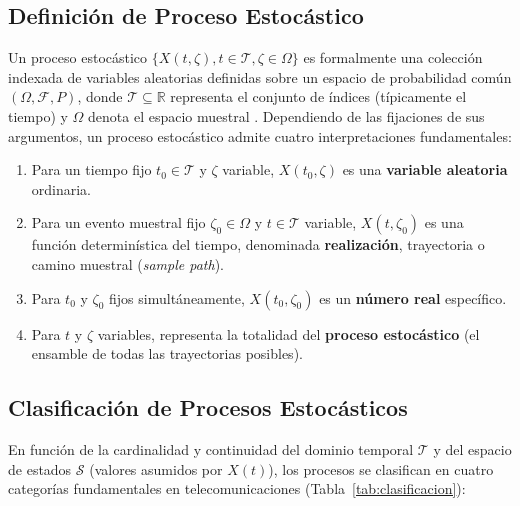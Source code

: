 \documentclass[conference]{IEEEtran}
\begin{document}
\subsection{Definición de Proceso Estocástico}
Un proceso estocástico $\{X(t, \zeta), t \in \mathcal{T}, \zeta \in \Omega\}$ es formalmente una colección indexada de variables aleatorias definidas sobre un espacio de probabilidad común $(\Omega, \mathcal{F}, P)$, donde $\mathcal{T} \subseteq \mathbb{R}$ representa el conjunto de índices (típicamente el tiempo) y $\Omega$ denota el espacio muestral \cite{papoulis2002}. Dependiendo de las fijaciones de sus argumentos, un proceso estocástico admite cuatro interpretaciones fundamentales:
\begin{enumerate}
    \item Para un tiempo fijo $t_0 \in \mathcal{T}$ y $\zeta$ variable, $X(t_0, \zeta)$ es una \textbf{variable aleatoria} ordinaria.
    \item Para un evento muestral fijo $\zeta_0 \in \Omega$ y $t \in \mathcal{T}$ variable, $X(t, \zeta_0)$ es una función determinística del tiempo, denominada \textbf{realización}, trayectoria o camino muestral (\textit{sample path}).
    \item Para $t_0$ y $\zeta_0$ fijos simultáneamente, $X(t_0, \zeta_0)$ es un \textbf{número real} específico.
    \item Para $t$ y $\zeta$ variables, representa la totalidad del \textbf{proceso estocástico} (el ensamble de todas las trayectorias posibles).
\end{enumerate}

\subsection{Clasificación de Procesos Estocásticos}
En función de la cardinalidad y continuidad del dominio temporal $\mathcal{T}$ y del espacio de estados $\mathcal{S}$ (valores asumidos por $X(t)$), los procesos se clasifican en cuatro categorías fundamentales en telecomunicaciones (Tabla~\ref{tab:clasificacion}):
\end{document}
